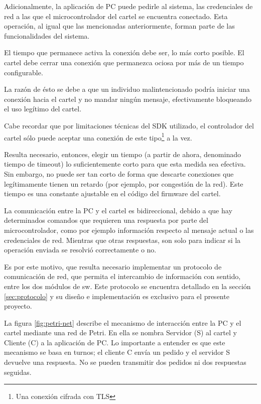 Adicionalmente, la aplicación de PC puede pedirle al sistema, las credenciales de red a las que el microcontrolador del cartel se encuentra conectado. Esta operación, al igual que las mencionadas anteriormente, forman parte de las funcionalidades del sistema.

El tiempo que permanece activa la conexión debe ser, lo más corto posible. El cartel debe cerrar una conexión que permanezca ociosa por más de un tiempo configurable.

La razón de ésto se debe a que un individuo malintencionado podría iniciar una conexión hacia el cartel y no mandar ningún mensaje, efectivamente bloqueando el uso legítimo del cartel.

Cabe recordar que por limitaciones técnicas del SDK utilizado, el controlador del cartel sólo puede aceptar una conexión de este tipo\footnote{Una conexión cifrada con TLS} a la vez. 

Resulta necesario, entonces, elegir un tiempo (a partir de ahora, denominado tiempo de timeout) lo suficientemente corto para que esta medida sea efectiva. Sin embargo, no puede ser tan corto de forma que descarte conexiones que legítimamente tienen un retardo (por ejemplo, por congestión de la red).  Este tiempo es una constante ajustable en el código del firmware del cartel.

La comunicación entre la PC y el cartel es bidireccional, debido a que hay determinados comandos que requieren una respuesta por parte del microcontrolador, como por ejemplo información respecto al mensaje actual o las credenciales de red.
Mientras que otras respuestas, son solo para indicar si la operación enviada se resolvió correctamente o no.

Es por este motivo, que resulta necesario implementar un protocolo de comunicación de red, que permita el intercambio de información con sentido, entre los dos módulos de sw.
Este protocolo se encuentra detallado en la sección \ref{sec:protocolo} y su diseño e implementación es exclusivo para el presente proyecto.

La figura \ref{fig:petri-net} describe el mecanismo de interacción entre la PC y el cartel mediante una red de Petri. En ella se nombra Servidor (S) al cartel y Cliente (C) a la aplicación de PC. Lo importante a entender es que este mecanismo se basa en turnos; el cliente C envía un pedido y el servidor S devuelve una respuesta. No se pueden transmitir dos pedidos ni dos respuestas seguidas.

